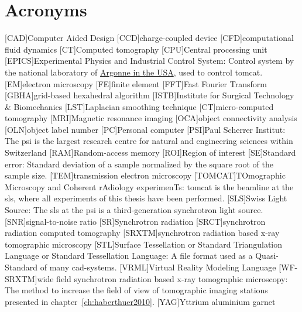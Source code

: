     \chapter*{Acronyms}
	\begin{acronym}[WF-SRXTM]
		[CAD]{Computer Aided Design}
		[CCD]{charge-coupled device}
		[CFD]{computational fluid dynamics}
		[CT]{Computed tomography}
		[CPU]{Central processing unit}
		[EPICS]{Experimental Physics and Industrial Control System}: Control system by the national laboratory of \href{http://www.aps.anl.gov/epics/}{Argonne in the USA}, used to control \acs{tomcat}.
		[EM]{electron microscopy}
		[FE]{finite element}
		[FFT]{Fast Fourier Transform}
		{grid-based hexahedral algorithm}
		{Institute for Surgical Technology \& Biomechanics}
		[LST]{Laplacian smoothing technique}
		[\micro CT]{micro-computed tomography}
		[MRI]{Magnetic resonance imaging}
		[OCA]{object connectivity analysis}
		[OLN]{object label number}
		[PC]{Personal computer}
		[PSI]{Paul Scherrer Institut}: The \acs{psi} is the largest research centre for natural and engineering sciences within Switzerland
		[RAM]{Random-access memory}
		[ROI]{Region of interest}
		[SE]{Standard error}: Standard deviation of a sample normalized by the square root of the sample size.
		[TEM]{transmission electron microscopy}
		[TOMCAT]{TOmographic Microscopy and Coherent rAdiology experimenTs}: \acs{tomcat} is the beamline at the \acs{sls}, where all experiments of this thesis have been performed.
		[SLS]{Swiss Light Source}: The \acs{sls} at the \acs{psi} is a third-generation synchrotron light source.
		[SNR]{signal-to-noise ratio}
		[SR]{Synchrotron radiation}
		{synchrotron radiation computed tomography}
		[SRXTM]{synchrotron radiation based x-ray tomographic microscopy}
		[STL]{Surface Tessellation or Standard Triangulation Language or Standard Tessellation Language}: A file format used as a Quasi-Standard of many \acs{cad}-systems.
		{Virtual Reality Modeling Language}
		[WF-SRXTM]{wide field synchrotron radiation based x-ray tomographic microscopy}: The method to increase the field of view of tomographic imaging stations presented in chapter~\ref{ch:haberthuer2010}.
		[YAG]{Yttrium aluminium garnet}
	\end{acronym}
\endgroup

\cleardoublepage